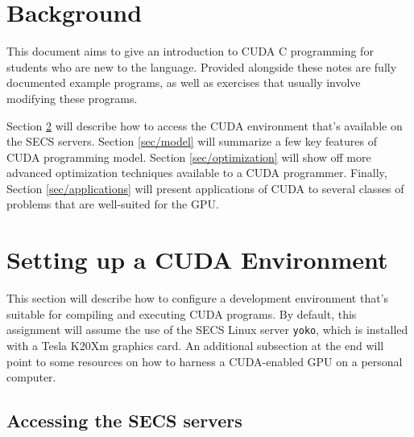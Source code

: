 \documentclass{article}
\theoremstyle{definition}
\begin{document}
\section{Background}
This document aims to give an introduction to CUDA C programming for students who are new to the language. Provided alongside these notes are fully documented example programs, as well as exercises that usually involve modifying these programs.

Section \ref{sec/setup} will describe how to access the CUDA environment that's available on the SECS servers. Section \ref{sec/model} will summarize a few key features of CUDA programming model. Section \ref{sec/optimization} will show off more advanced optimization techniques available to a CUDA programmer. Finally, Section \ref{sec/applications} will present applications of CUDA to several classes of problems that are well-suited for the GPU.

\section{Setting up a CUDA Environment}
\label{sec/setup}

This section will describe how to configure a development environment that's suitable for compiling and executing CUDA programs. By default, this assignment will assume the use of the SECS Linux server \texttt{yoko}, which is installed with a Tesla K20Xm graphics card. An additional subsection at the end will point to some resources on how to harness a CUDA-enabled GPU on a personal computer.

\subsection{Accessing the SECS servers}
\end{document}
